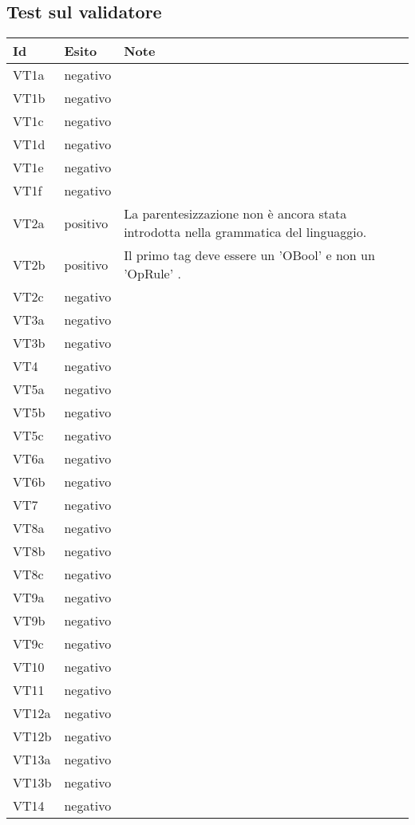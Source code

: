 \subsection{Test sul validatore}
\begin{center}
\begin{tabular}{|p{1cm}|p{1.6cm}|p{8.4cm}|} \hline
\textbf{Id} & \textbf{Esito} & \textbf{Note} \\ \hline
VT1a & negativo & \\ \hline
VT1b & negativo & \\ \hline
VT1c & negativo & \\ \hline
VT1d & negativo & \\ \hline
VT1e & negativo & \\ \hline
VT1f & negativo & \\ \hline
VT2a & positivo & La parentesizzazione non \`e ancora stata introdotta nella grammatica del linguaggio. \\ \hline
VT2b & positivo & Il primo tag deve essere un 'OBool' e non un 'OpRule' .\\ \hline
VT2c & negativo & \\ \hline
VT3a & negativo & \\ \hline
VT3b & negativo & \\ \hline
VT4 & negativo & \\ \hline
VT5a & negativo & \\ \hline
VT5b & negativo & \\ \hline
VT5c & negativo & \\ \hline
VT6a & negativo & \\ \hline
VT6b & negativo & \\ \hline
VT7 & negativo & \\ \hline
VT8a & negativo & \\ \hline
VT8b & negativo & \\ \hline
VT8c & negativo & \\ \hline
VT9a & negativo & \\ \hline
VT9b & negativo & \\ \hline
VT9c & negativo & \\ \hline
VT10 & negativo & \\ \hline
VT11 & negativo & \\ \hline
VT12a & negativo & \\ \hline
VT12b & negativo & \\ \hline
VT13a & negativo & \\ \hline
VT13b & negativo & \\ \hline
VT14 & negativo & \\ \hline
\end{tabular} \\
\end{center}

